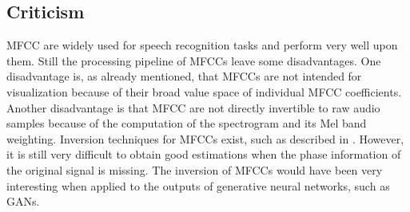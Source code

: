 
\subsection{Criticism}
MFCC are widely used for speech recognition tasks and perform very well upon them. 
Still the processing pipeline of MFCCs leave some disadvantages.
One disadvantage is, as already mentioned, that MFCCs are not intended for visualization because of their broad value space of individual MFCC coefficients.
Another disadvantage is that MFCC are not directly invertible to raw audio samples because of the computation of the spectrogram and its Mel band weighting.
Inversion techniques for MFCCs exist, such as described in \cite{Boucheron2008}.
However, it is still very difficult to obtain good estimations when the phase information of the original signal is missing.
The inversion of MFCCs would have been very interesting when applied to the outputs of generative neural networks, such as GANs.